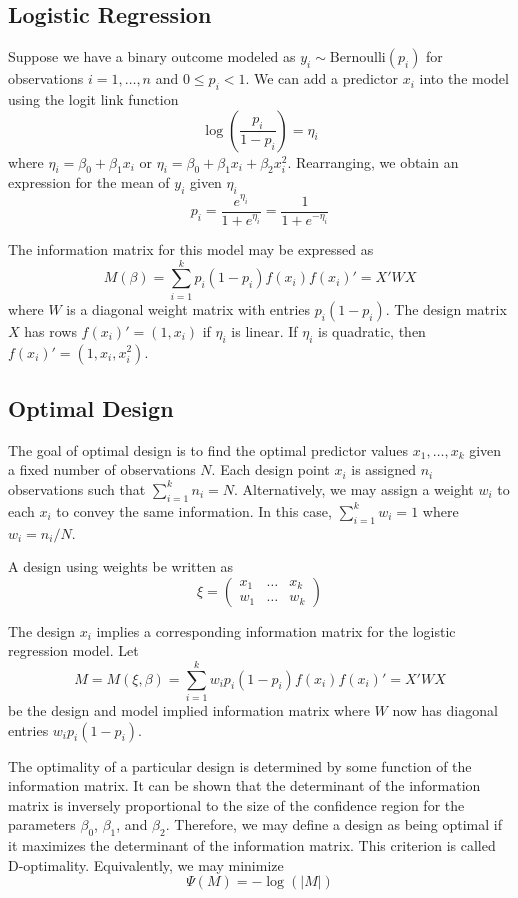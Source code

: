 \documentclass[11pt,a4paper]{article}
\begin{document}
\subsection{Logistic Regression}
Suppose we have a binary outcome modeled as $y_i \sim \text{Bernoulli}(p_i)$ for observations $i = 1, \dots, n$ and $0 \leq p_i < 1$. We can add a predictor $x_i$ into the model using the logit link function
$$
\log\left( \frac{p_i}{1-p_i}\right) = \eta_i
$$
where $\eta_i = \beta_0  + \beta_1 x_{i}$ or $\eta_i = \beta_0  + \beta_1 x_{i} + \beta_2 x_i^2$. Rearranging, we obtain an expression for the mean of $y_i$ given $\eta_i$
$$
p_i = \frac{e^{\eta_i}}{1+e^{\eta_i}}= \frac{1}{1+e^{-\eta_i}} 
$$

The information matrix for this model may be expressed as
$$
M(\beta) = \sum_{i=1}^k p_i (1-p_i) f(x_i) f(x_i)' = X'WX
$$
where $W$ is a diagonal weight matrix with entries $p_i (1-p_i)$. The design matrix $X$ has rows $f(x_i)' = (1, x_i)$ if $\eta_i$ is linear. If $\eta_i$ is quadratic, then $f(x_i)' = (1,x_i,x_i^2)$.
\subsection{Optimal Design}
The goal of optimal design is to find the optimal predictor values $x_1,\dots, x_k $ given a fixed number of observations $N$. Each design point $x_i$ is assigned $n_i$ observations such that $\sum_{i=1}^k n_i = N$. Alternatively, we may assign a weight $w_i$ to each $x_i$ to convey the same information. In this case, $\sum_{i=1}^k w_i = 1$ where $w_i = n_i/N$.

\par A design using weights be written as
$$
\xi =
\begin{pmatrix}
x_1 & \dots & x_k\\
w_1 & \dots & w_k
\end{pmatrix}
$$

The design $x_i$ implies a corresponding information matrix for the logistic regression model. Let
$$
M = M(\xi, \beta) = \sum_{i=1}^k w_ip_i (1-p_i) f(x_i) f(x_i)' = X'WX
$$
be the design and model implied information matrix where $W$ now has diagonal entries $w_i p_i (1-p_i)$.

The optimality of a particular design is determined by some function of the information matrix. It can be shown that the determinant of the information matrix is inversely proportional to the size of the confidence region for the parameters $\beta_0$, $\beta_1$, and $\beta_2$. Therefore, we may define a design as being optimal if it maximizes the determinant of the information matrix. This criterion is called D-optimality. Equivalently, we may minimize
$$
\Psi(M) = -\log(|M|)
$$
\end{document}
